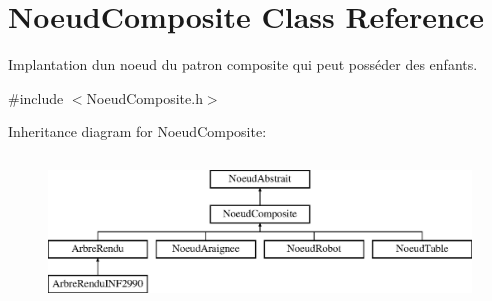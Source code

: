 \hypertarget{class_noeud_composite}{}\section{Noeud\+Composite Class Reference}
\label{class_noeud_composite}


Implantation d\textquotesingle{}un noeud du patron composite qui peut posséder des enfants.  




{\ttfamily \#include $<$Noeud\+Composite.\+h$>$}

Inheritance diagram for Noeud\+Composite\+:\begin{figure}[H]
\begin{center}
\leavevmode
\includegraphics[height=4.000000cm]{class_noeud_composite}
\end{center}
\end{figure}
